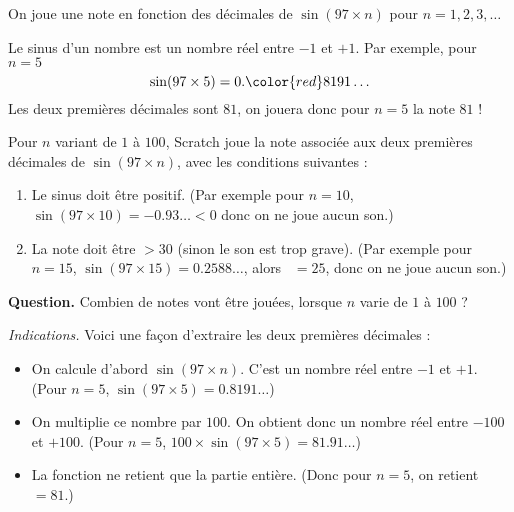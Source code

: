 \documentclass[class=report,crop=false, 12pt]{standalone}
\begin{document}


\begin{enigme}

On joue une note en fonction des décimales de $\sin( 97 \times n )$ pour  
$n=1,2,3,\ldots$

Le sinus d'un nombre est un nombre réel entre $-1$ et $+1$.
Par exemple, pour $n = 5$ 
$$\sin( 97 \times 5 ) = 0.{\color{red}81}91\ldots$$
Les deux premières décimales sont $81$, on jouera donc pour $n=5$ la note $81$ !



Pour $n$ variant de $1$ à $100$, Scratch joue la note associée aux deux premières décimales de $\sin( 97 \times n )$, avec les conditions suivantes :
\begin{enumerate}
  \item Le sinus doit être positif. (Par exemple pour $n=10$, $\sin( 97 \times 10)=-0.93\ldots< 0$ donc on ne joue aucun son.)
  \item La note doit être $>30$ (sinon le son est trop grave). (Par exemple pour $n=15$, $\sin( 97\times 15 )=0.2588\ldots$, alors \, $=25$, donc on ne joue aucun son.)
\end{enumerate}


\bigskip

\textbf{Question.} Combien de notes vont être jouées, lorsque $n$ varie de $1$ à $100$ ?


\bigskip

\emph{Indications.}
Voici une façon d'extraire les deux premières décimales :
\begin{center}
\end{center}

\begin{itemize}
  \item On calcule d'abord $\sin(97 \times n)$. C'est un nombre réel entre $-1$ et $+1$.
  (Pour $n=5$, $\sin(97 \times 5) = 0.8191\ldots$)
  \item On multiplie ce nombre par $100$. On obtient donc un nombre réel entre $-100$ et $+100$. (Pour $n=5$, $100 \times \sin(97 \times 5 ) = 81.91\ldots$)
  \item La fonction  ne retient que la partie entière.
(Donc pour $n=5$, on retient \,$ = 81$.)
\end{itemize}




\end{enigme}
\end{document}
